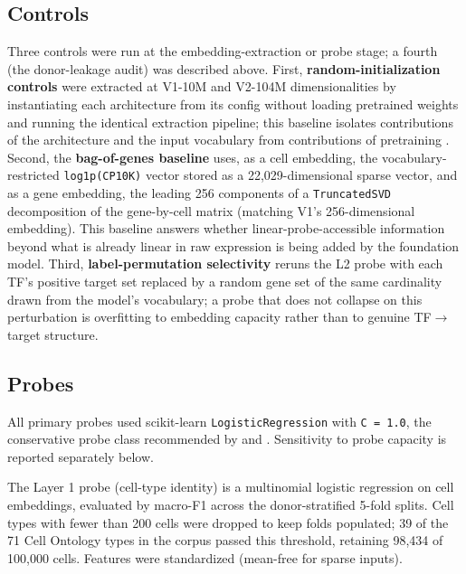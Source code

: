 \documentclass[10pt]{article}
\begin{document}
\subsection{Controls}\label{controls}

Three controls were run at the embedding-extraction or probe stage; a
fourth (the donor-leakage audit) was described above. First,
\textbf{random-initialization controls} were extracted at V1-10M and
V2-104M dimensionalities by instantiating each architecture from its
config without loading pretrained weights and running the identical
extraction pipeline; this baseline isolates contributions of the
architecture and the input vocabulary from contributions of pretraining
\citep{zhang2018random}. Second, the \textbf{bag-of-genes baseline}
uses, as a cell embedding, the vocabulary-restricted
\texttt{log1p(CP10K)} vector stored as a 22,029-dimensional sparse
vector, and as a gene embedding, the leading 256 components of a
\texttt{TruncatedSVD} decomposition of the gene-by-cell matrix (matching
V1's 256-dimensional embedding). This baseline answers whether
linear-probe-accessible information beyond what is already linear in raw
expression is being added by the foundation model. Third,
\textbf{label-permutation selectivity} \citep{hewitt2019} reruns
the L2 probe with each TF's positive target set replaced by a random
gene set of the same cardinality drawn from the model's vocabulary; a
probe that does not collapse on this perturbation is overfitting to
embedding capacity rather than to genuine TF$\to$target structure.

\subsection{Probes}\label{probes}

All primary probes used scikit-learn \texttt{LogisticRegression} with
\texttt{C\ =\ 1.0}, the conservative probe class recommended by
\citet{hewitt2019} and \citet{belinkov2022}. Sensitivity to probe capacity is
reported separately below.

The Layer 1 probe (cell-type identity) is a multinomial logistic
regression on cell embeddings, evaluated by macro-F1 across the
donor-stratified 5-fold splits. Cell types with fewer than 200 cells
were dropped to keep folds populated; 39 of the 71 Cell Ontology types
in the corpus passed this threshold, retaining 98,434 of 100,000 cells.
Features were standardized (mean-free for sparse inputs).
\end{document}
